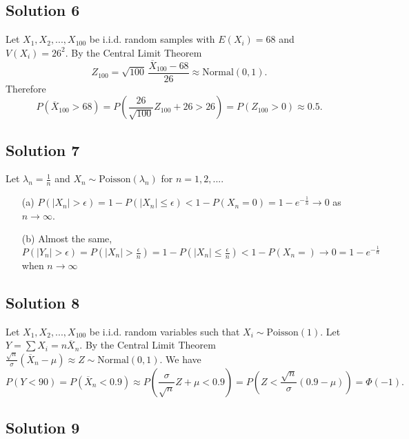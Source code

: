 \subsection*{Solution 6}

Let $X_1, X_2, ..., X_{100}$ be i.i.d. random samples with $E(X_i) = 68$ and $V(X_i) = 26^2$.
By the Central Limit Theorem
\begin{equation*}
    Z_{100} = \sqrt{100}\, \frac{\overline{X}_{100} - 68}{26} \approx \mathrm{Normal}(0, 1).
\end{equation*}
Therefore
\begin{equation*}
    P(\overline{X}_{100} > 68) = P\left(\frac{26}{\sqrt{100}} Z_{100} + 26 > 26\right)
        = P(Z_{100} > 0)
        \approx 0.5.
\end{equation*}


\subsection*{Solution 7}

Let $\lambda_n = \frac{1}{n}$ and $X_n \sim \mathrm{Poisson}(\lambda_n)$ for $n = 1, 2, ...$.
\begin{itemize}
    \item[(a)] $P(|X_n| > \epsilon) = 1 - P(|X_n| \leq \epsilon) < 1 - P(X_n = 0) = 1 - e^{-\frac{1}{n}} \to 0$ as $n \to \infty$.
    \item[(b)] Almost the same, $P(|Y_n| > \epsilon) = P(|X_n| > \frac{\epsilon}{n}) = 1 - P(|X_n| \leq \frac{\epsilon}{n}) < 1 - P(X_n = ) \to 0 = 1 - e^{-\frac{1}{n}}$ when $n \to \infty$
\end{itemize}


\subsection*{Solution 8}

Let $X_1, X_2, ..., X_{100}$ be i.i.d. random variables such that $X_i \sim \mathrm{Poisson}(1)$.
Let $Y = \sum X_i = n \overline{X}_n$.
By the Central Limit Theorem $\frac{\sqrt{n}}{\sigma} (\overline{X}_n - \mu) \approx Z \sim \mathrm{Normal}(0, 1)$.
We have
\begin{equation*}
    P(Y < 90) = P(\overline{X}_n < 0.9)
        \approx P(\frac{\sigma}{\sqrt{n}} Z + \mu < 0.9)
        = P(Z < \frac{\sqrt{n}}{\sigma} (0.9 - \mu))
        = \Phi(-1).
\end{equation*}


\subsection*{Solution 9}

